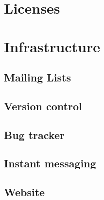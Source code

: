 \documentclass{article} %
\begin{document}
\section{Licenses}
\section{Infrastructure} %
\subsection{Mailing Lists}
\subsection{Version control}
\subsection{Bug tracker}
\subsection{Instant messaging}
\subsection{Website}


\end{document}
